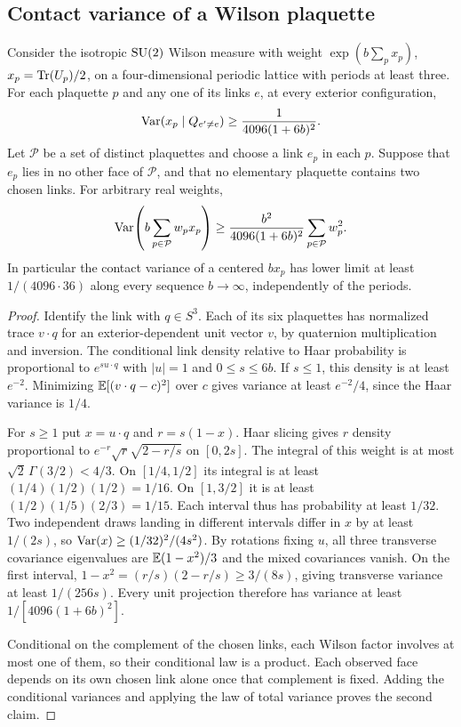 \subsection{Contact variance of a Wilson plaquette}
\begin{proposition}\label{cl:prop:sparse-contact}
Consider the isotropic $\mathrm{SU}(2)$ Wilson measure with weight
$\exp(b\sum_p x_p)$, $x_p=\operatorname{Tr}(U_p)/2$, on a four-dimensional periodic
lattice with periods at least three. For each plaquette $p$ and any one
of its links $e$, at every exterior configuration,
\[
 \operatorname{Var}(x_p\mid Q_{e'\ne e})\ge \frac{1}{4096(1+6b)^2}.
\]
Let $\mathcal P$ be a set of distinct plaquettes and choose a link
$e_p$ in each $p$. Suppose that $e_p$ lies in no other face of
$\mathcal P$, and that no elementary plaquette contains two chosen
links. For arbitrary real weights,
\[
 \operatorname{Var}\!\left(b\sum_{p\in\mathcal P} w_p x_p\right)
 \ge \frac{b^2}{4096(1+6b)^2}\sum_{p\in\mathcal P} w_p^2 .
\]
In particular the contact variance of a centered $b x_p$ has lower
limit at least $1/(4096\cdot36)$ along every sequence $b\to\infty$,
independently of the periods.
\end{proposition}
\begin{proof}
Identify the link with $q\in S^3$. Each of its six plaquettes has
normalized trace $v\cdot q$ for an exterior-dependent unit vector $v$,
by quaternion multiplication and inversion. The conditional link
density relative to Haar probability is proportional to $e^{s u\cdot q}$
with $|u|=1$ and $0\le s\le6b$. If $s\le1$, this density is at least
$e^{-2}$. Minimizing $\mathbb{E}[(v\cdot q-c)^2]$ over $c$ gives variance at
least $e^{-2}/4$, since the Haar variance is $1/4$.

For $s\ge1$ put $x=u\cdot q$ and $r=s(1-x)$. Haar slicing gives
$r$ density proportional to $e^{-r}\sqrt r\sqrt{2-r/s}$ on $[0,2s]$.
The integral of this weight is at most
$\sqrt2\,\Gamma(3/2)<4/3$. On $[1/4,1/2]$ its integral is at least
$(1/4)(1/2)(1/2)=1/16$. On $[1,3/2]$ it is at least
$(1/2)(1/5)(2/3)=1/15$. Each interval thus has probability at
least $1/32$. Two independent draws landing in different intervals
differ in $x$ by at least $1/(2s)$, so
$\operatorname{Var}(x)\ge(1/32)^2/(4s^2)$. By rotations fixing $u$, all three
transverse covariance eigenvalues are $\mathbb{E}(1-x^2)/3$ and the mixed
covariances vanish. On the first interval,
$1-x^2=(r/s)(2-r/s)\ge3/(8s)$, giving transverse variance at least
$1/(256s)$. Every unit projection therefore has variance at least
$1/[4096(1+6b)^2]$.

Conditional on the complement of the chosen links, each Wilson factor
involves at most one of them, so their conditional law is a product.
Each observed face depends on its own chosen link alone once that
complement is fixed. Adding the conditional variances and applying the
law of total variance proves the second claim.
\end{proof}
